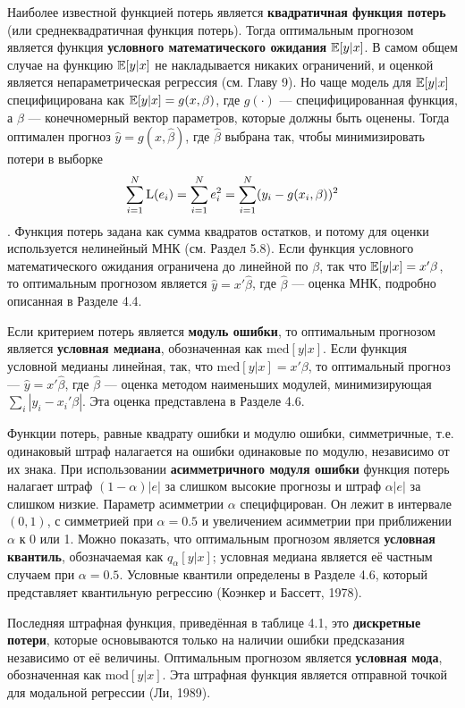 Наиболее известной функцией потерь является \textbf{квадратичная функция потерь}  (или среднеквадратичная функция потерь). Тогда оптимальным прогнозом является функция \textbf{условного математического ожидания} $\mathbb{E}{[y|x]}$. В самом общем случае на функцию $\mathbb{E}{[y|x]}$ не накладывается никаких ограничений, и оценкой является непараметрическая регрессия (см. Главу 9). Но чаще модель для $\mathbb{E}{[y|x]}$ специфицирована как $\mathbb{E}{[y|x]} = g(x, \beta)$, где $g(\cdot)$ --- специфицированная функция, а $\beta$ --- конечномерный вектор параметров, которые должны быть оценены. Тогда оптимален прогноз $\hat{y} = g(x, \hat{\beta})$, где $\hat{\beta}$ выбрана так, чтобы минимизировать потери в выборке 
\[
\sum_{i=1}^{N}\mathrm{L}(e_i) = \sum_{i=1}^{N}e_i^2 = \sum_{i=1}^{N}(y_i - g(x_i, \beta))^2
\].
Функция потерь задана как сумма квадратов остатков, и потому для оценки используется нелинейный МНК (см. Раздел 5.8). Если функция условного математического ожидания ограничена до линейной по $\beta$, так что $\mathbb{E}{[y|x]} = x' \beta $, то оптимальным прогнозом является $\hat{y}=x'\hat{\beta}$, где $\hat{\beta}$ --- оценка МНК, подробно описанная в Разделе 4.4. 

Если критерием потерь является \textbf{модуль ошибки}, то оптимальным прогнозом является \textbf{условная медиана}, обозначенная как $\mathrm{med}[y|x]$. Если функция условной медианы линейная, так, что $\mathrm{med}[y|x] = x'\beta$, то оптимальный прогноз --- $\hat{y}=x'\hat{\beta}$, где  $\hat{\beta}$ --- оценка методом наименьших модулей, минимизирующая $\sum_i |y_i - x_i ' \beta|$. Эта оценка представлена в Разделе 4.6.

Функции потерь, равные квадрату ошибки и модулю ошибки, симметричные, т.е. одинаковый штраф  налагается на ошибки одинаковые по модулю, независимо от их знака.  При использовании \textbf{асимметричного модуля ошибки}  функция потерь  налагает штраф  $(1-\alpha) |e|$ за слишком высокие прогнозы и штраф $\alpha |e|$ за слишком низкие. Параметр асимметрии $\alpha$ специфцирован. Он лежит в интервале $(0, 1)$, с симметрией при $\alpha = 0.5$ и увеличением асимметрии при приближении $\alpha$ к 0 или 1. Можно показать, что оптимальным прогнозом является \textbf{условная квантиль}, обозначаемая как $q_{\alpha}[y|x]$; условная медиана является её частным случаем при $\alpha = 0.5$. Условные квантили определены в Разделе 4.6, который представляет квантильную регрессию (Коэнкер и Бассетт, 1978).

Последняя штрафная функция, приведённая в таблице 4.1, это \textbf{дискретные потери}, которые основываются только на наличии ошибки предсказания независимо от её величины. Оптимальным прогнозом является \textbf{условная мода}, обозначенная как $\mathrm{mod}[y|x]$. Эта штрафная функция является отправной точкой для  модальной регрессии (Ли, 1989).

